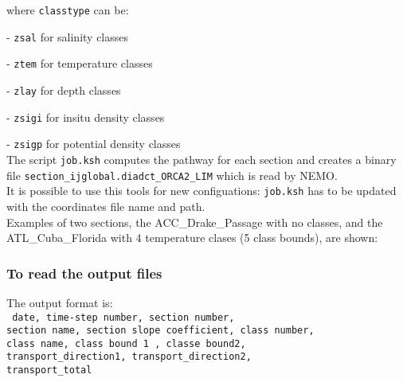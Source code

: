 \documentclass[../tex_main/NEMO_manual]{subfiles}
\begin{document}
\noindent where \texttt{classtype} can be:

 - \texttt{zsal}  for          salinity classes

 - \texttt{ztem}  for       temperature classes

 - \texttt{zlay}  for             depth classes

 - \texttt{zsigi} for    insitu density classes

 - \texttt{zsigp} for potential density classes \\
  
 The script \texttt{job.ksh} computes the pathway for each section and creates a binary file
 \texttt{section\_ijglobal.diadct\_ORCA2\_LIM} which is read by NEMO. \\

 It is possible to use this tools for new configuations: \texttt{job.ksh} has to be updated with
 the coordinates file name and path. \\

 Examples of two sections, the ACC\_Drake\_Passage with no classes,
 and the ATL\_Cuba\_Florida with 4 temperature clases (5 class bounds), are shown: \\

\subsubsection{To read the output files}

The output format is: \\
{\scriptsize \texttt{
date, time-step number, section number,                \\
section name, section slope coefficient, class number, \\
class name, class bound 1 , classe bound2,             \\
transport\_direction1, transport\_direction2,          \\
transport\_total}}                                     \\
\end{document}
